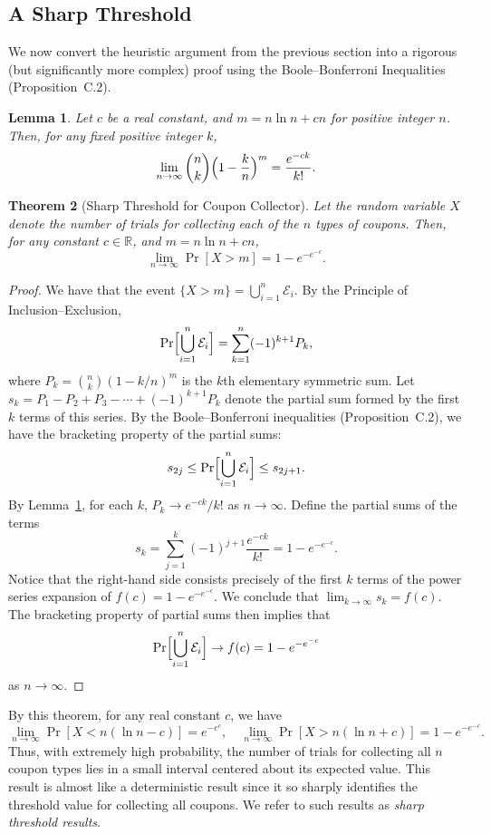 \documentclass[twoside,12pt]{book}
\theoremstyle{plain}
\newtheorem{theorem}{Theorem}[chapter]
\newtheorem{lemma}[theorem]{Lemma}
\theoremstyle{definition}
\theoremstyle{remark}
\begin{document}
\subsection{A Sharp Threshold}

We now convert the heuristic argument from the previous section into a rigorous (but significantly more complex) proof using the Boole--Bonferroni Inequalities (Proposition~C.2).

\begin{lemma}
\label{lem:coupon-tech}
Let $c$ be a real constant, and $m = n \ln n + cn$ for positive integer $n$. Then, for any fixed positive integer $k$,
\[
\lim_{n \to \infty} \binom{n}{k}\Bigl(1 - \frac{k}{n}\Bigr)^m = \frac{e^{-ck}}{k!}.
\]
\end{lemma}

\begin{theorem}[Sharp Threshold for Coupon Collector]
\label{thm:coupon-sharp}
Let the random variable $X$ denote the number of trials for collecting each of the $n$ types of coupons. Then, for any constant $c \in \mathbb{R}$, and $m = n \ln n + cn$,
\[
\lim_{n \to \infty} \Pr[X > m] = 1 - e^{-e^{-c}}.
\]
\end{theorem}

\begin{proof}
We have that the event $\{X > m\} = \bigcup_{i=1}^{n} \mathcal{E}_i$. By the Principle of Inclusion--Exclusion,
\[
\Pr\Bigl[\bigcup_{i=1}^{n} \mathcal{E}_i\Bigr] = \sum_{k=1}^{n} (-1)^{k+1} P_k,
\]
where $P_k = \binom{n}{k} (1 - k/n)^m$ is the $k$th elementary symmetric sum. Let $s_k = P_1 - P_2 + P_3 - \cdots + (-1)^{k+1} P_k$ denote the partial sum formed by the first $k$ terms of this series. By the Boole--Bonferroni inequalities (Proposition~C.2), we have the bracketing property of the partial sums:
\[
s_{2j} \leq \Pr\Bigl[\bigcup_{i=1}^{n} \mathcal{E}_i\Bigr] \leq s_{2j+1}.
\]
By Lemma~\ref{lem:coupon-tech}, for each $k$, $P_k \to e^{-ck}/k!$ as $n \to \infty$. Define the partial sums of the terms
\[
s_k = \sum_{j=1}^{k} (-1)^{j+1} \frac{e^{-ck}}{k!} = 1 - e^{-e^{-c}}.
\]
Notice that the right-hand side consists precisely of the first $k$ terms of the power series expansion of $f(c) = 1 - e^{-e^{-c}}$. We conclude that $\lim_{k \to \infty} s_k = f(c)$. The bracketing property of partial sums then implies that
\[
\Pr\Bigl[\bigcup_{i=1}^{n} \mathcal{E}_i\Bigr] \to f(c) = 1 - e^{-e^{-c}}
\]
as $n \to \infty$.
\end{proof}

By this theorem, for any real constant $c$, we have
\[
\lim_{n \to \infty} \Pr[X < n(\ln n - c)] = e^{-e^c}, \quad
\lim_{n \to \infty} \Pr[X > n(\ln n + c)] = 1 - e^{-e^{-c}}.
\]
Thus, with extremely high probability, the number of trials for collecting all $n$ coupon types lies in a small interval centered about its expected value. This result is almost like a deterministic result since it so sharply identifies the threshold value for collecting all coupons. We refer to such results as \emph{sharp threshold results}.
\end{document}
